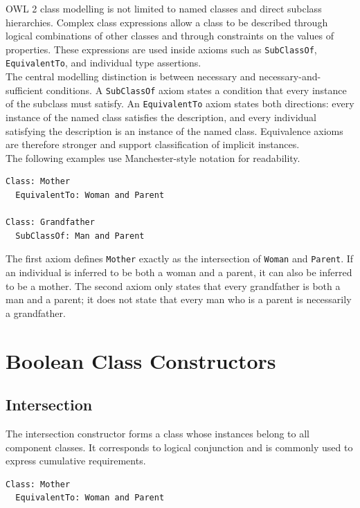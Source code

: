 \documentclass{scrbook}
\begin{document}
	OWL 2 class modelling is not limited to named classes and direct subclass hierarchies. Complex class expressions allow a class to be described through logical combinations of other classes and through constraints on the values of properties. These expressions are used inside axioms such as \texttt{SubClassOf}, \texttt{EquivalentTo}, and individual type assertions.\\
	
	The central modelling distinction is between necessary and necessary-and-sufficient conditions. A \texttt{SubClassOf} axiom states a condition that every instance of the subclass must satisfy. An \texttt{EquivalentTo} axiom states both directions: every instance of the named class satisfies the description, and every individual satisfying the description is an instance of the named class. Equivalence axioms are therefore stronger and support classification of implicit instances.\\
	
	The following examples use Manchester-style notation for readability.
	
	\begin{lstlisting}
Class: Mother
  EquivalentTo: Woman and Parent

Class: Grandfather
  SubClassOf: Man and Parent
	\end{lstlisting}
	
	The first axiom defines \texttt{Mother} exactly as the intersection of \texttt{Woman} and \texttt{Parent}. If an individual is inferred to be both a woman and a parent, it can also be inferred to be a mother. The second axiom only states that every grandfather is both a man and a parent; it does not state that every man who is a parent is necessarily a grandfather.
	
	\section{Boolean Class Constructors}
	
	\subsection{Intersection}
	
	The intersection constructor forms a class whose instances belong to all component classes. It corresponds to logical conjunction and is commonly used to express cumulative requirements.
	
	\begin{lstlisting}
Class: Mother
  EquivalentTo: Woman and Parent
	\end{lstlisting}
	
\end{document}
